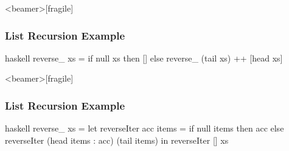\documentclass[dvipsnames]{beamer}
\theoremstyle{plain}
\begin{document}
\begin{frame}<beamer>[fragile]
  \frametitle{List Recursion Example}

  \begin{example}
    \begin{pygments}{haskell}
reverse_ xs =
    if null xs
    then []
    else reverse_ (tail xs) ++ [head xs]
    \end{pygments}
  \end{example}
\end{frame}

\begin{frame}<beamer>[fragile]
  \frametitle{List Recursion Example}

  \begin{example}
    \begin{pygments}{haskell}
reverse_ xs =
    let
        reverseIter acc items =
            if null items
            then acc
            else reverseIter (head items : acc) (tail items)
    in
        reverseIter [] xs
    \end{pygments}
  \end{example}
\end{frame}
% 
% 
% 
\end{document}
